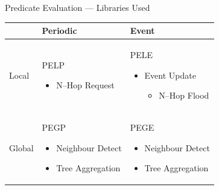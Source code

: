 \documentclass[usenames,dvipsnames]{beamer}
\begin{document}
\begin{frame}{Predicate Evaluation --- Libraries Used}
\begin{table}[H]
\centering
\begin{tabular}{| l | p{4.2cm} | p{4.2cm} |}
\hline
~ & Periodic & Event\\
\hline
Local & PELP
	\begin{itemize}
		\item N--Hop Request
	\end{itemize}
 & PELE
	\begin{itemize}
		\item Event Update
			\begin{itemize}
				\item N--Hop Flood
			\end{itemize}
	\end{itemize}\\
\hline
Global & PEGP
	\begin{itemize}
		\item Neighbour Detect
		\item Tree Aggregation
	\end{itemize}
 & PEGE
	\begin{itemize}
		\item Neighbour Detect
		\item Tree Aggregation
	\end{itemize}\\
\hline
\end{tabular}
\end{table}
\end{frame}
\end{document}
